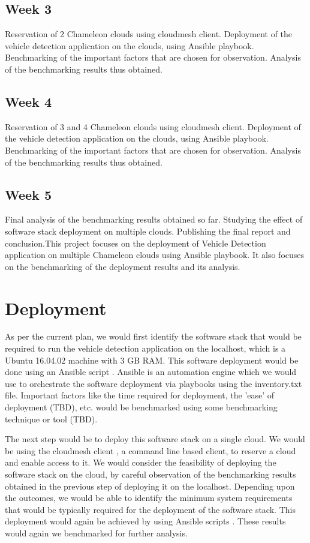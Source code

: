 \documentclass[9pt,twocolumn,twoside]{styles/osajnl}
\begin{document}
\subsection{Week 3}
Reservation of 2 Chameleon clouds using cloudmesh client.  Deployment
of the vehicle detection application on the clouds, using Ansible
playbook.  Benchmarking of the important factors that are chosen for
observation.  Analysis of the benchmarking results thus obtained.

\subsection{Week 4}
Reservation of 3 and 4 Chameleon clouds using cloudmesh client.
Deployment of the vehicle detection application on the clouds, using
Ansible playbook.  Benchmarking of the important factors that are
chosen for observation.  Analysis of the benchmarking results thus
obtained.

\subsection{Week 5}
Final analysis of the benchmarking results obtained so far.  Studying
the effect of software stack deployment on multiple clouds.
Publishing the final report and conclusion.This project focuses on the
deployment of Vehicle Detection application on multiple Chameleon
clouds using Ansible playbook.  It also focuses on the benchmarking of
the deployment results and its analysis.

\section{Deployment}

As per the current plan, we would first identify the software stack
that would be required to run the vehicle detection application on the
localhost, which is a Ubuntu 16.04.02 machine with 3 GB RAM.  This
software deployment would be done using an Ansible script
\cite{Ansible}.  Ansible is an automation engine which we would use to
orchestrate the software deployment via playbooks using the
inventory.txt file.  Important factors like the time required for
deployment, the 'ease' of deployment (TBD), etc. would be benchmarked
using some benchmarking technique or tool (TBD).

The next step would be to deploy this software stack on a single
cloud.  We would be using the cloudmesh client
\cite{github-cloudmesh-client}, a command line based client, to
reserve a cloud and enable access to it.  We would consider the
feasibility of deploying the software stack on the cloud, by careful
observation of the benchmarking results obtained in the previous step
of deploying it on the localhost.  Depending upon the outcomes, we
would be able to identify the minimum system requirements that would
be typically required for the deployment of the software stack.  This
deployment would again be achieved by using Ansible
scripts \cite{Ansible}.  These results would again we benchmarked for
further analysis.
	
\end{document}
